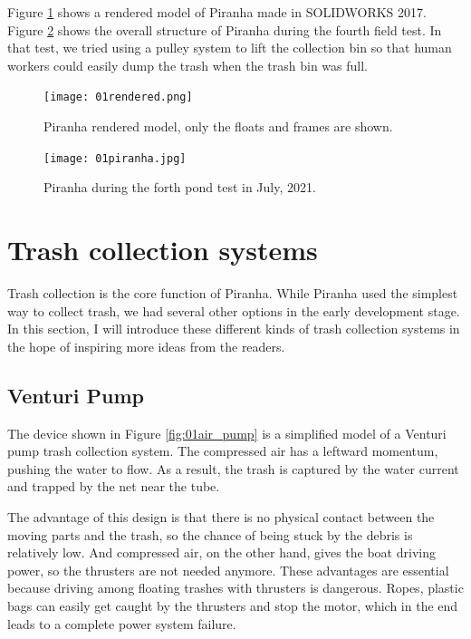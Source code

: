 Figure \ref{fig:01rendered} shows a rendered model of Piranha made in SOLIDWORKS 2017. Figure \ref{fig:01piranha} shows the overall structure of Piranha during the fourth field test. In that test, we tried using a pulley system to lift the collection bin so that human workers could easily dump the trash when the trash bin was full.

\begin{figure}[H]
    \centering
    \texttt{[image: 01rendered.png]}
    \caption{Piranha rendered model, only the floats and frames are shown.}
    \label{fig:01rendered}
\end{figure}

\begin{figure}[H]
    \centering
    \texttt{[image: 01piranha.jpg]}
    \caption{Piranha during the forth pond test in July, 2021.}
    \label{fig:01piranha}
\end{figure}

\section{Trash collection systems}

Trash collection is the core function of Piranha. While Piranha used the simplest way to collect trash, we had several other options in the early development stage. In this section, I will introduce these different kinds of trash collection systems in the hope of inspiring more ideas from the readers.

\subsection{Venturi Pump}

The device shown in Figure \ref{fig:01air_pump} is a simplified model of a Venturi pump trash collection system. The compressed air has a leftward momentum, pushing the water to flow. As a result, the trash is captured by the water current and trapped by the net near the tube.

The advantage of this design is that there is no physical contact between the moving parts and the trash, so the chance of being stuck by the debris is relatively low. And compressed air, on the other hand, gives the boat driving power, so the thrusters are not needed anymore. These advantages are essential because driving among floating trashes with thrusters is dangerous. Ropes, plastic bags can easily get caught by the thrusters and stop the motor, which in the end leads to a complete power system failure.

